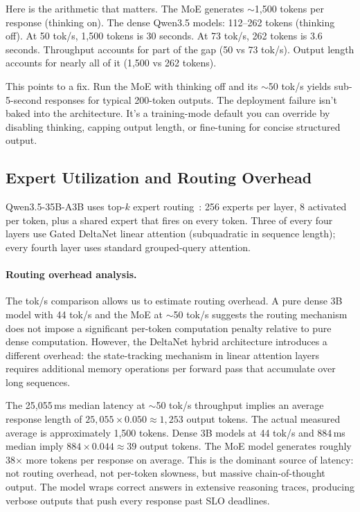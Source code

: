 \documentclass[11pt]{article}
\begin{document}
Here is the arithmetic that matters.  The MoE generates ${\sim}$1,500 tokens per response (thinking on).  The dense Qwen3.5 models: 112--262 tokens (thinking off).  At 50 tok/s, 1,500 tokens is 30 seconds.  At 73 tok/s, 262 tokens is 3.6 seconds.  Throughput accounts for part of the gap (50 vs 73 tok/s).  Output length accounts for nearly all of it (1,500 vs 262 tokens).

This points to a fix.  Run the MoE with thinking off and its ${\sim}$50 tok/s yields sub-5-second responses for typical 200-token outputs.  The deployment failure isn't baked into the architecture.  It's a training-mode default you can override by disabling thinking, capping output length, or fine-tuning for concise structured output.

\subsection{Expert Utilization and Routing Overhead}
\label{sec:expert-utilization}

Qwen3.5-35B-A3B uses top-$k$ expert routing~\citep{qwen2025qwen3}: 256 experts per layer, 8 activated per token, plus a shared expert that fires on every token.  Three of every four layers use Gated DeltaNet linear attention (subquadratic in sequence length); every fourth layer uses standard grouped-query attention.

\paragraph{Routing overhead analysis.}
The tok/s comparison allows us to estimate routing overhead.  A pure dense 3B model with 44 tok/s and the MoE at ${\sim}$50 tok/s suggests the routing mechanism does not impose a significant per-token computation penalty relative to pure dense computation.  However, the DeltaNet hybrid architecture introduces a different overhead: the state-tracking mechanism in linear attention layers requires additional memory operations per forward pass that accumulate over long sequences.

The 25,055\,ms median latency at ${\sim}$50 tok/s throughput implies an average response length of $25{,}055 \times 0.050 \approx 1{,}253$ output tokens.  The actual measured average is approximately 1,500 tokens.  Dense 3B models at 44 tok/s and 884\,ms median imply $884 \times 0.044 \approx 39$ output tokens.  The MoE model generates roughly 38$\times$ more tokens per response on average.  This is the dominant source of latency: not routing overhead, not per-token slowness, but massive chain-of-thought output.  The model wraps correct answers in extensive reasoning traces, producing verbose outputs that push every response past SLO deadlines.
\end{document}

